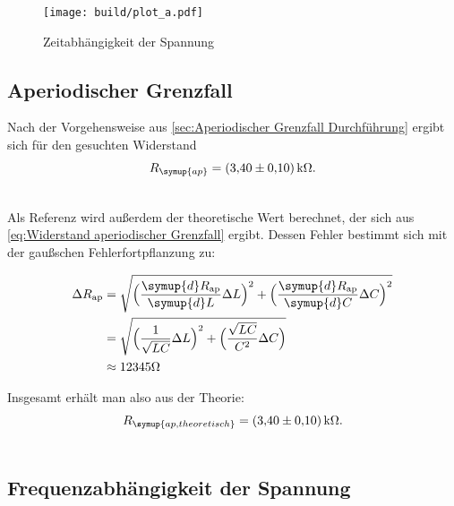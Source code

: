 \begin{figure} [H]
  \centering
  \texttt{[image: build/plot\_a.pdf]}
  \caption{Zeitabhängigkeit der Spannung}
  \label{fig:plot_a}
\end{figure}

\subsection{Aperiodischer Grenzfall}
\label{sec:Aperiodischer Grenzfall}

Nach der Vorgehensweise aus \autoref{sec:Aperiodischer Grenzfall Durchführung} ergibt sich für den gesuchten Widerstand \\
\begin{gather*}
  R_{\symup{ap}} = \qty{3,40+-0.1}{\kilo\ohm}. \\ \notag
\end{gather*}

Als Referenz wird außerdem der theoretische Wert berechnet, der sich aus \eqref{eq:Widerstand aperiodischer Grenzfall} ergibt.
Dessen Fehler bestimmt sich mit der gaußschen Fehlerfortpflanzung zu:

\begin{align*}
  \label{eqn:Fehler Rap}
  \Delta R_{\text{ap}} &= \sqrt{\Bigl(\frac{\symup{d}R_{\text{ap}}}{\symup{d}L}\Delta L \Bigr)^2+\Bigl(\frac{\symup{d}R_{\text{ap}}}{\symup{d}C}\Delta C\Bigr)^2} \\
  &= \sqrt{\Bigl(\frac{1}{\sqrt{LC}}\Delta L\Bigr)^2+\Bigl(\frac{\sqrt{LC}}{C^2}\Delta C\Bigr)} \\
  &\approx 12345 \unit{\ohm}
\end{align*}

Insgesamt erhält man also aus der Theorie:
\begin{gather*}
  R_{\symup{ap, theoretisch}} = \qty{3,40+-0.1}{\kilo\ohm}. \\ \notag
\end{gather*}

\subsection{Frequenzabhängigkeit der Spannung}
\label{sec:Frequenzabhängigkeit der Spannung}

